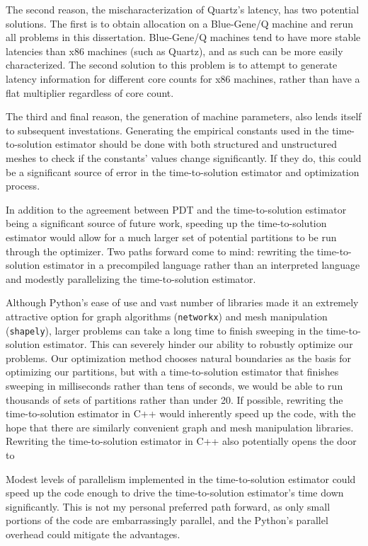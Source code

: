 The second reason, the mischaracterization of Quartz's latency, has two potential solutions.
The first is to obtain allocation on a Blue-Gene/Q machine and rerun all problems in this dissertation.
Blue-Gene/Q machines tend to have more stable latencies than x86 machines (such as Quartz), and as such can be more easily characterized.
The second solution to this problem is to attempt to generate latency information for different core counts for x86 machines, rather than have a flat multiplier regardless of core count.

The third and final reason, the generation of machine parameters, also lends itself to subsequent investations.
Generating the empirical constants used in the time-to-solution estimator should be done with both structured and unstructured meshes to check if the constants' values change significantly.
If they do, this could be a significant source of error in the time-to-solution estimator and optimization process.

In addition to the agreement between PDT and the time-to-solution estimator being a significant source of future work, speeding up the time-to-solution estimator would allow for a much larger set of potential partitions to be run through the optimizer.
Two paths forward come to mind: rewriting the time-to-solution estimator in a precompiled language rather than an interpreted language and modestly parallelizing the time-to-solution estimator.

Although Python's ease of use and vast number of libraries made it an extremely attractive option for graph algorithms ({\tt networkx}) and mesh manipulation ({\tt shapely}), larger problems can take a long time to finish sweeping in the time-to-solution estimator.
This can severely hinder our ability to robustly optimize our problems.
Our optimization method chooses natural boundaries as the basis for optimizing our partitions, but with a time-to-solution estimator that finishes sweeping in milliseconds rather than tens of seconds, we would be able to run thousands of sets of partitions rather than under 20.
If possible, rewriting the time-to-solution estimator in C++ would inherently speed up the code, with the hope that there are similarly convenient graph and mesh manipulation libraries.
Rewriting the time-to-solution estimator in C++ also potentially opens the door to

Modest levels of parallelism implemented in the time-to-solution estimator could speed up the code enough to drive the time-to-solution estimator's time down significantly.
This is not my personal preferred path forward, as only small portions of the code are embarrassingly parallel, and the Python's parallel overhead could mitigate the advantages.
